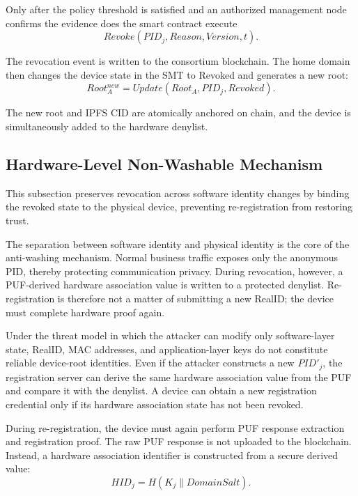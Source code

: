 \documentclass[lettersize,journal]{IEEEtran}
\begin{document}
	Only after the policy threshold is satisfied and an authorized management node confirms the evidence does the smart contract execute
	\begin{equation}
		Revoke(PID_j,Reason,Version,t).
	\end{equation}
	
	The revocation event is written to the consortium blockchain. The home domain then changes the device state in the SMT to Revoked and generates a new root:
	\begin{equation}
		Root_A^{new}=Update(Root_A,PID_j,Revoked).
	\end{equation}
	
	The new root and IPFS CID are atomically anchored on chain, and the device is simultaneously added to the hardware denylist.
	
	\subsection{Hardware-Level Non-Washable Mechanism}
	This subsection preserves revocation across software identity changes by binding the revoked state to the physical device, preventing re-registration from restoring trust.
	
	
	The separation between software identity and physical identity is the core of the anti-washing mechanism. Normal business traffic exposes only the anonymous PID, thereby protecting communication privacy. During revocation, however, a PUF-derived hardware association value is written to a protected denylist. Re-registration is therefore not a matter of submitting a new RealID; the device must complete hardware proof again.
	
	Under the threat model in which the attacker can modify only software-layer state, RealID, MAC addresses, and application-layer keys do not constitute reliable device-root identities. Even if the attacker constructs a new $PID'_j$, the registration server can derive the same hardware association value from the PUF and compare it with the denylist. A device can obtain a new registration credential only if its hardware association state has not been revoked.
	
	During re-registration, the device must again perform PUF response extraction and registration proof. The raw PUF response is not uploaded to the blockchain. Instead, a hardware association identifier is constructed from a secure derived value:
	\begin{equation}
		HID_j=H(K_j\parallel DomainSalt).
	\end{equation}
	
\end{document}
